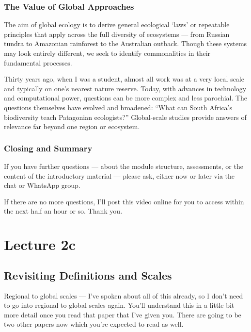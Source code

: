 \documentclass[
  10pt,
]{book}
\begin{document}
\subsection{The Value of Global
Approaches}\label{the-value-of-global-approaches}

The aim of global ecology is to derive general ecological `laws' or
repeatable principles that apply across the full diversity of ecosystems
--- from Russian tundra to Amazonian rainforest to the Australian
outback. Though these systems may look entirely different, we seek to
identify commonalities in their fundamental processes.

Thirty years ago, when I was a student, almost all work was at a very
local scale and typically on one's nearest nature reserve. Today, with
advances in technology and computational power, questions can be more
complex and less parochial. The questions themselves have evolved and
broadened: ``What can South Africa's biodiversity teach Patagonian
ecologists?'' Global-scale studies provide answers of relevance far
beyond one region or ecosystem.

\subsection{Closing and Summary}\label{closing-and-summary}

If you have further questions --- about the module structure,
assessments, or the content of the introductory material --- please ask,
either now or later via the chat or WhatsApp group.

If there are no more questions, I'll post this video online for you to
access within the next half an hour or so. Thank you.

\chapter*{Lecture 2c}\label{lecture-2c}

\section{Revisiting Definitions and
Scales}\label{revisiting-definitions-and-scales}

Regional to global scales --- I've spoken about all of this already, so
I don't need to go into regional to global scales again. You'll
understand this in a little bit more detail once you read that paper
that I've given you. There are going to be two other papers now which
you're expected to read as well.
\end{document}
